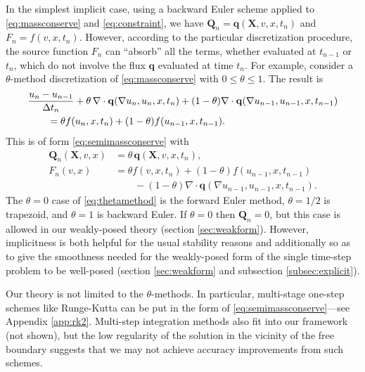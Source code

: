 \documentclass[final,leqno,onefignum,onetabnum]{siamltex1213bueler}
\newcommand\bq{\mathbf{q}}
\newcommand\bQ{\mathbf{Q}}
\newcommand\bX{\mathbf{X}}
\newcommand{\Div}{\nabla\cdot}
\renewcommand{\grad}{\nabla}
\begin{document}
In the simplest implicit case, using a backward Euler scheme applied to \eqref{eq:massconserve} and \eqref{eq:constraint}, we have $\bQ_n = \bq(\bX,v,x,t_n)$ and $F_n = f(v,x,t_n)$.  However, according to the particular discretization procedure, the source function $F_n$ can ``absorb'' all the terms, whether evaluated at $t_{n-1}$ or $t_n$, which do not involve the flux $\bq$ evaluated at time $t_n$.  For example, consider a $\theta$-method discretization \cite{MortonMayers2005} of \eqref{eq:massconserve} with $0\le \theta \le 1$.  The result is
\begin{align}
  &\frac{u_n - u_{n-1}}{\Delta t_n} + \theta\, \Div \bq(\grad u_n,u_n,x,t_n) + (1-\theta) \Div \bq(\grad u_{n-1},u_{n-1},x,t_{n-1}) \label{eq:thetamethod} \\
  &\qquad =  \theta f(u_n,x,t_n) + (1-\theta) f(u_{n-1},x,t_{n-1}). \notag
\end{align}
This is of form \eqref{eq:semimassconserve} with
\begin{align*}
\bQ_n(\bX,v,x) &= \theta\, \bq(\bX,v,x,t_n), \\
F_n(v,x)       &= \theta f(v,x,t_n) + (1-\theta) f(u_{n-1},x,t_{n-1}) \\
               &\qquad - (1-\theta) \Div \bq(\grad u_{n-1},u_{n-1},x,t_{n-1}).
\end{align*}
The $\theta=0$ case of \eqref{eq:thetamethod} is the forward Euler method, $\theta=1/2$ is trapezoid, and $\theta=1$ is backward Euler.  If $\theta=0$ then $\bQ_n=0$, but this case is allowed in our weakly-posed theory (section \ref{sec:weakform}).  However, implicitness is both helpful for the usual stability reasons \cite{MortonMayers2005} and additionally so as to give the smoothness needed for the weakly-posed form of the single time-step problem to be well-posed (section \ref{sec:weakform} and subsection \ref{subsec:explicit}).

Our theory is not limited to the $\theta$-methods.  In particular, multi-stage one-step schemes like Runge-Kutta can be put in the form of \eqref{eq:semimassconserve}---see Appendix \ref{app:rk2}.  Multi-step integration methods also fit into our framework (not shown), but the low regularity of the solution in the vicinity of the free boundary suggests that we may not achieve accuracy improvements from such schemes.
\end{document}
